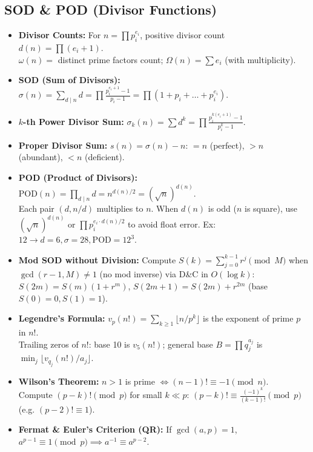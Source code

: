 \subsection{SOD \& POD (Divisor Functions)}
\begin{itemize}\setlength{\itemsep}{1pt}\setlength{\parskip}{0pt}\setlength{\parsep}{0pt}
  \item \textbf{Divisor Counts:} For $n = \prod p_i^{e_i}$, positive divisor count $d(n) = \prod (e_i+1)$. \\
  $\omega(n) =$ distinct prime factors count; $\Omega(n) = \sum e_i$ (with multiplicity).
  \item \textbf{SOD (Sum of Divisors):} $\sigma(n) = \sum_{d \mid n} d = \prod \frac{p_i^{e_i+1}-1}{p_i-1} = \prod (1+p_i+\dots+p_i^{e_i})$.
  \item \textbf{$k$-th Power Divisor Sum:} $\sigma_k(n) = \sum d^k = \prod \frac{p_i^{k(e_i+1)}-1}{p_i^k-1}$.
  \item \textbf{Proper Divisor Sum:} $s(n) = \sigma(n) - n$: $=n$ (perfect), $>n$ (abundant), $<n$ (deficient).
  \item \textbf{POD (Product of Divisors):} $\text{POD}(n) = \prod_{d \mid n} d = n^{d(n)/2} = (\sqrt{n})^{d(n)}$. \\
  Each pair $(d, n/d)$ multiplies to $n$. When $d(n)$ is odd ($n$ is square), use $(\sqrt{n})^{d(n)}$ or $\prod p_i^{e_i \cdot d(n)/2}$ to avoid float error. Ex: $12 \to d=6, \sigma=28, \text{POD}=12^3$.
  \item \textbf{Mod SOD without Division:} Compute $S(k) = \sum_{j=0}^{k-1} r^j \pmod M$ when $\gcd(r-1, M) \ne 1$ (no mod inverse) via D\&C in $O(\log k)$: $S(2m) = S(m)(1+r^m)$, $S(2m+1) = S(2m) + r^{2m}$ (base $S(0)=0, S(1)=1$).
  \item \textbf{Legendre's Formula:} $v_p(n!) = \sum_{k \ge 1} \lfloor n/p^k \rfloor$ is the exponent of prime $p$ in $n!$. \\
  Trailing zeros of $n!$: base 10 is $v_5(n!)$; general base $B = \prod q_j^{a_j}$ is $\min_j \lfloor v_{q_j}(n!)/a_j \rfloor$.
  \item \textbf{Wilson's Theorem:} $n > 1$ is prime $\iff (n-1)! \equiv -1 \pmod n$. \\
  Compute $(p-k)! \pmod p$ for small $k \ll p$: $(p-k)! \equiv \frac{(-1)^k}{(k-1)!} \pmod p$ (e.g. $(p-2)! \equiv 1$).
  \item \textbf{Fermat \& Euler's Criterion (QR):} If $\gcd(a,p)=1$, $a^{p-1} \equiv 1 \pmod p \implies a^{-1} \equiv a^{p-2}$. \\

\end{itemize}
